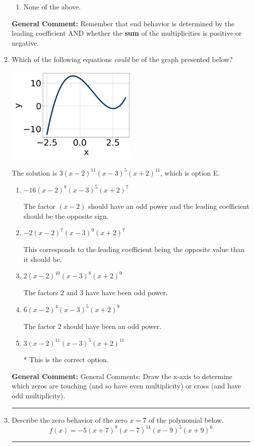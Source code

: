 \documentclass{extbook}[14pt]
\newcommand{\litem}[1]{\item #1

\rule{\textwidth}{0.4pt}}
\begin{document}
\begin{enumerate}
{\begin{enumerate}[label=\Alph*.]
\begin{multicols}{2}
\end{multicols}\item None of the above.\end{enumerate}
\textbf{General Comment:} Remember that end behavior is determined by the leading coefficient AND whether the \textbf{sum} of the multiplicities is positive or negative.
}
\litem{
Which of the following equations \textit{could} be of the graph presented below?

\begin{center}
    \includegraphics[width=0.5\textwidth]{../Figures/polyGraphToFunctionC.png}
\end{center}




The solution is \( 3(x - 2)^{11} (x - 3)^{5} (x + 2)^{11} \), which is option E.\begin{enumerate}[label=\Alph*.]
\item \( -16(x - 2)^{8} (x - 3)^{5} (x + 2)^{7} \)

The factor $(x - 2)$ should have an odd power and the leading coefficient should be the opposite sign.
\item \( -2(x - 2)^{7} (x - 3)^{9} (x + 2)^{7} \)

This corresponds to the leading coefficient being the opposite value than it should be.
\item \( 2(x - 2)^{10} (x - 3)^{8} (x + 2)^{9} \)

The factors $2$ and $3$ have have been odd power.
\item \( 6(x - 2)^{4} (x - 3)^{5} (x + 2)^{9} \)

The factor $2$ should have been an odd power.
\item \( 3(x - 2)^{11} (x - 3)^{5} (x + 2)^{11} \)

* This is the correct option.
\end{enumerate}

\textbf{General Comment:} General Comments: Draw the x-axis to determine which zeros are touching (and so have even multiplicity) or cross (and have odd multiplicity).
}
\litem{
Describe the zero behavior of the zero $x = 7$ of the polynomial below.
\[ f(x) = -5(x + 7)^{9}(x - 7)^{14}(x - 9)^{5}(x + 9)^{6} \]

}
\end{enumerate}
\end{document}
